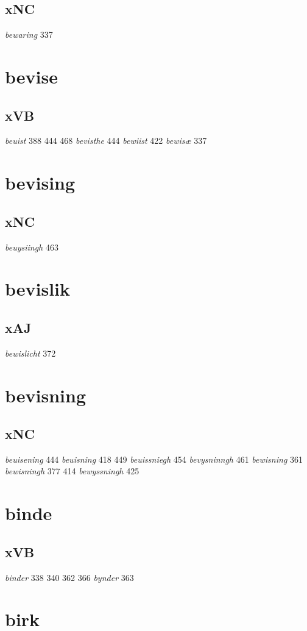 \documentclass[a4paper,twocolumn]{article}
\begin{document}
\subsection{xNC}
\label{sec:orgbcf0021}
\emph{bewaring} 337 
\section{bevise}
\label{sec:orgd70ddab}
\subsection{xVB}
\label{sec:orga9ba1d8}
\emph{beuist} 388 444 468 \emph{bevisthe} 444 \emph{bewiist} 422 \emph{bewisæ} 337 
\section{bevising}
\label{sec:org40c8d74}
\subsection{xNC}
\label{sec:org3ccb6e7}
\emph{beuysiingh} 463 
\section{bevislik}
\label{sec:org56443a3}
\subsection{xAJ}
\label{sec:orga456024}
\emph{bewislicht} 372 
\section{bevisning}
\label{sec:org0ee838d}
\subsection{xNC}
\label{sec:org9a5e526}
\emph{beuisening} 444 \emph{beuisning} 418 449 \emph{beuissniegh} 454 \emph{bevysninngh} 461 \emph{bewisning} 361 \emph{bewisningh} 377 414 \emph{bewyssningh} 425 
\section{binde}
\label{sec:org4633e35}
\subsection{xVB}
\label{sec:org24ee8ee}
\emph{binder} 338 340 362 366 \emph{bynder} 363 
\section{birk}
\label{sec:orga46c93c}
\end{document}
